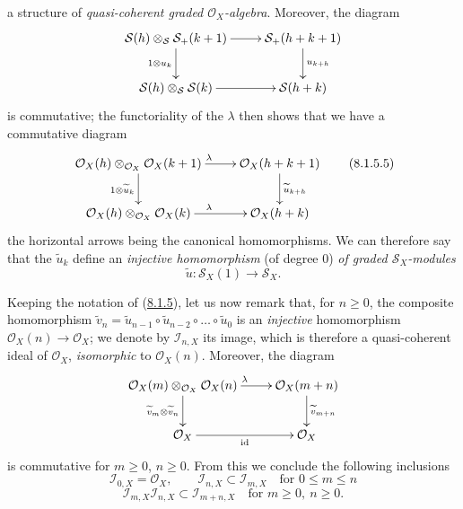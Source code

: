 \begin{env}[8.1.5]
a structure of \emph{quasi-coherent graded $\mathcal{O}_X$-algebra}. Moreover, the
diagram
\[
\xymatrix{
  \mathcal{S}(h)\otimes_{\mathcal{S}}\mathcal{S}_+(k+1)\ar[r]\ar[d]_{1\otimes u_k}
  & \mathcal{S}_+(h+k+1)\ar[d]^{u_{k+h}}\\
  \mathcal{S}(h)\otimes_{\mathcal{S}}\mathcal{S}(k)\ar[r]
  & \mathcal{S}(h+k)
}
\]
is commutative; the functoriality of the $\lambda$ then shows that we have a
commutative diagram
\begin{equation}
\label{II.8.1.5.5}
\xymatrix{
  \mathcal{O}_X(h)\otimes_{\mathcal{O}_X}\mathcal{O}_X(k+1)
    \ar[r]^{\lambda}\ar[d]_{1\otimes\widetilde{u}_k}
  & \mathcal{O}_X(h+k+1)\ar[d]^{\widetilde{u}_{k+h}}\\
  \mathcal{O}_X(h)\otimes_{\mathcal{O}_X}\mathcal{O}_X(k)
    \ar[r]^{\lambda}
  & \mathcal{O}_X(h+k)
}
\tag{8.1.5.5}
\end{equation}
the horizontal arrows being the canonical homomorphisms. We can therefore
say that the $\widetilde{u}_k$ define an \emph{injective homomorphism} (of
degree $0$) \emph{of graded $\mathcal{S}_X$-modules}
\begin{equation}
\label{II.8.1.5.6}
  \widetilde{u}:\mathcal{S}_X(1)\to\mathcal{S}_X.
\tag{8.1.5.6}
\end{equation}
\end{env}

\begin{env}[8.1.6]
\label{II.8.1.6}
Keeping the notation of (\hyperref[II.8.1.5]{8.1.5}), let us now remark
that, for $n\geq0$, the composite homomorphism
$\widetilde{v}_n=\widetilde{u}_{n-1}\circ\widetilde{u}_{n-2}\circ\ldots\circ\widetilde{u}_0$
is an \emph{injective} homomorphism $\mathcal{O}_X(n)\to\mathcal{O}_X$;
we denote by $\mathcal{I}_{n,X}$ its image, which is therefore a
quasi-coherent ideal of $\mathcal{O}_X$, \emph{isomorphic} to $\mathcal{O}_X(n)$.
Moreover, the diagram
\[
\xymatrix{
  \mathcal{O}_X(m)\otimes_{\mathcal{O}_X}\mathcal{O}_X(n)
    \ar[r]^{\lambda}\ar[d]_{\widetilde{v}_m\otimes\widetilde{v}_n}
  & \mathcal{O}_X(m+n)\ar[d]^{\widetilde{v}_{m+n}}\\
  \mathcal{O}_X\ar[r]_{\mathrm{id}}
  & \mathcal{O}_X
}
\]
is commutative for $m\geq0$, $n\geq0$. From this we conclude the following
inclusions
\begin{equation}
\label{II.8.1.6.1}
  \mathcal{I}_{0,X}=\mathcal{O}_X,\qquad
  \mathcal{I}_{n,X}\subset\mathcal{I}_{m,X}
  \quad\text{for }0\leq m\leq n
\tag{8.1.6.1}
\end{equation}
\begin{equation}
\label{II.8.1.6.2}
  \mathcal{I}_{m,X}\mathcal{I}_{n,X}\subset\mathcal{I}_{m+n,X}
  \quad\text{for }m\geq0,\ n\geq0.
\tag{8.1.6.2}
\end{equation}
\end{env}

